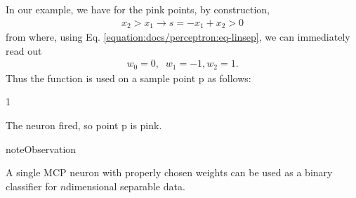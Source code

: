 \documentclass[a4paper,12pt,polish]{jupyterBook}
\begin{document}
\sphinxAtStartPar
In our example, we have for the pink points, by construction,
\begin{equation*}
\begin{split}
x_2>x_1 \to s=-x_1+x_2 >0
\end{split}
\end{equation*}
\sphinxAtStartPar
from where, using  Eq. \eqref{equation:docs/perceptron:eq-linsep}, we can immediately read out
\begin{equation*}
\begin{split}
w_0=0, \;\; w_1=-1, w_2=1.
\end{split}
\end{equation*}
\sphinxAtStartPar
Thus the  function is used on a sample point p as follows:
\begin{sphinxVerbatimInput}

\begin{sphinxVerbatim}[commandchars=\\\{\}]
\PYG{p}{[}\PYG{p}{]}      
\PYG{p}{[}\PYG{p}{]}       

\end{sphinxVerbatim}
\end{sphinxVerbatimInput}
\begin{sphinxVerbatimOutput}

\begin{sphinxVerbatim}[commandchars=\\\{\}]
1
\end{sphinxVerbatim}
\end{sphinxVerbatimOutput}

\sphinxAtStartPar
The neuron fired, so point p is pink.

\begin{sphinxadmonition}{note}{Observation}

\sphinxAtStartPar
A single MCP neuron with properly chosen weights can be used as a binary classifier for \(n\)\sphinxhyphen{}dimensional separable data.
\end{sphinxadmonition}
\end{document}
